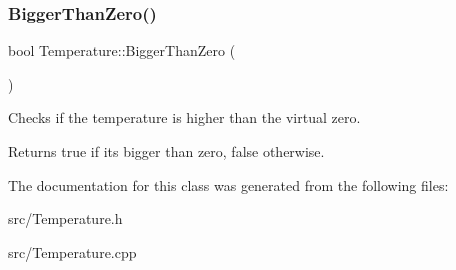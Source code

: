 \subsubsection{\texorpdfstring{Bigger\+Than\+Zero()}{BiggerThanZero()}}
{\footnotesize\ttfamily bool Temperature\+::\+Bigger\+Than\+Zero (\begin{DoxyParamCaption}{ }\end{DoxyParamCaption})}



Checks if the temperature is higher than the virtual zero. 

\begin{DoxyReturn}{Returns}
true if its bigger than zero, false otherwise. 
\end{DoxyReturn}


The documentation for this class was generated from the following files\+:\begin{DoxyCompactItemize}
\item 
src/Temperature.\+h\item 
src/Temperature.\+cpp\end{DoxyCompactItemize}
